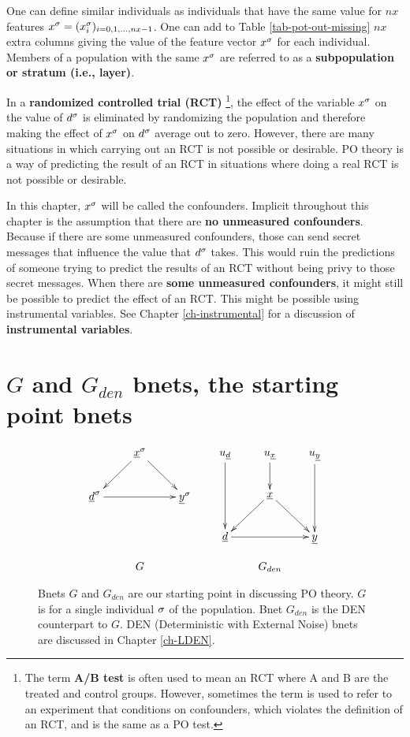 One can define
similar
individuals as
individuals that have the same
value
for $nx$ features $x^\sigma=(x^\sigma_i)_{i=0, 1, \ldots, nx-1}$.
One
can add to Table \ref{tab-pot-out-missing}
 $nx$ extra columns
giving the value of
the feature vector $x^\sigma$
for each individual.
Members
of a population with
the same $x^\sigma$
are referred to as
a
{\bf subpopulation or stratum (i.e., layer)}.

In a {\bf randomized controlled trial (RCT)}
\footnote{The term {\bf A/B test}
is often used to mean an RCT
where A and B are the treated and control groups. However,
sometimes the term is used to refer to
an experiment  that conditions on confounders,
which violates the definition of an RCT,
and is the same as a PO test.},
the effect
of the variable $x^\sigma$ on
the value
of $d^\sigma$
is eliminated by
randomizing
the population
and therefore
making the effect of $x^\sigma$
on $d^\sigma$
average out  to zero.
However,
there are many situations
in which carrying out an RCT is not
possible
or desirable. PO theory is
a way of predicting the
result
of an RCT in situations where
doing a real RCT is not possible
or desirable.

In this chapter, $x^\sigma$
will be called the confounders.
Implicit throughout this chapter
is the assumption that there are {\bf
no unmeasured confounders}.
Because if
there are some unmeasured confounders,
those can
send secret messages
that influence the value
that $d^\sigma$ takes.
This would ruin
the
predictions
of someone trying
to predict the results of an RCT
without
being privy to those secret
messages.
When there are {\bf some
unmeasured confounders},
it might still be
possible
to
predict the effect of an RCT.
This might be possible
using instrumental variables. See Chapter
\ref{ch-instrumental}
for a discussion
of {\bf instrumental
variables}.


\section{$G$ and $G_{den}$
bnets,
the starting point bnets}


\begin{figure}[h!]
$$
\begin{array}{ccc}
\xymatrix{
&\rvx^\s\ar[dl]\ar[dr]
\\
\rvd^\s\ar[rr]&&\rvy^\s
}
&&
\xymatrix{
u_\rvd\ar[dd]&u_\rvx\ar[d]&u_\rvy\ar[dd]
\\
&\rvx\ar[dl]\ar[dr]
\\
\rvd\ar[rr]&&\rvy
}
\\
\\
G&&G_{den}
\end{array}
$$
\caption{Bnets
$G$ and $G_{den}$
are
our starting
point in discussing PO theory.
 $G$ is for
a single individual $\sigma$ of the
population.
Bnet $G_{den}$ is the
DEN counterpart
to $G$.
DEN (Deterministic with
External Noise) bnets are discussed in Chapter
\ref{ch-LDEN}.}
\label{fig-po-G-start}
\end{figure}

